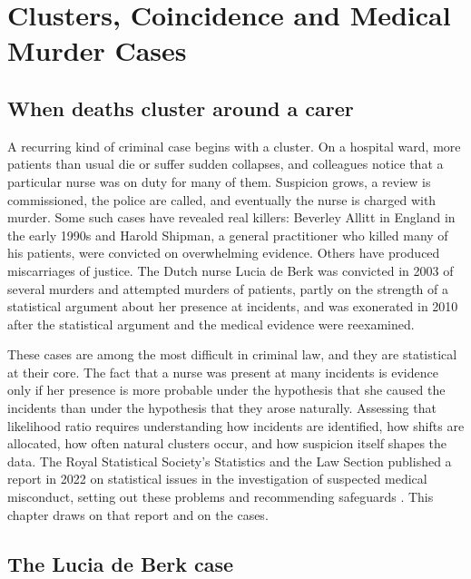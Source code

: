\chapter{Clusters, Coincidence and Medical Murder Cases}
\label{ch:clusters}

\section{When deaths cluster around a carer}

A recurring kind of criminal case begins with a cluster. On a hospital ward, more patients than usual die or suffer sudden collapses, and colleagues notice that a particular nurse was on duty for many of them. Suspicion grows, a review is commissioned, the police are called, and eventually the nurse is charged with murder. Some such cases have revealed real killers: Beverley Allitt in England in the early 1990s and Harold Shipman, a general practitioner who killed many of his patients, were convicted on overwhelming evidence. Others have produced miscarriages of justice. The Dutch nurse Lucia de Berk was convicted in 2003 of several murders and attempted murders of patients, partly on the strength of a statistical argument about her presence at incidents, and was exonerated in 2010 after the statistical argument and the medical evidence were reexamined.

These cases are among the most difficult in criminal law, and they are statistical at their core. The fact that a nurse was present at many incidents is evidence only if her presence is more probable under the hypothesis that she caused the incidents than under the hypothesis that they arose naturally. Assessing that likelihood ratio requires understanding how incidents are identified, how shifts are allocated, how often natural clusters occur, and how suspicion itself shapes the data. The Royal Statistical Society's Statistics and the Law Section published a report in 2022 on statistical issues in the investigation of suspected medical misconduct, setting out these problems and recommending safeguards \citep{rss2022}. This chapter draws on that report and on the cases.

\section{The Lucia de Berk case}

